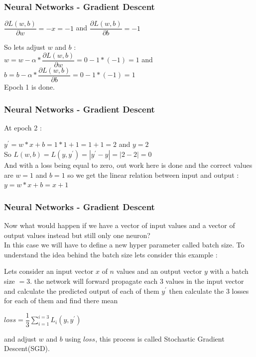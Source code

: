 \documentclass{beamer}
\begin{document}
\begin{frame}
\frametitle{Neural Networks - Gradient Descent}
\begin{example}
\begin{center}
$ \dfrac{\partial L(w,b)}{\partial w} = -x = -1 $ \hspace{5mm} and \hspace{5mm} $ \dfrac{\partial L(w,b)}{\partial b} = -1 $
\end{center}
\begin{center}
So lets adjust $ w $ and $ b $ :\\
$ w = w - \alpha*\dfrac{\partial L(w,b)}{\partial w} = 0 - 1*(-1) = 1 $ \hspace{5mm} and \hspace{5mm} $ b = b - \alpha*\dfrac{\partial L(w,b)}{\partial b} = 0 - 1*(-1) = 1 $\\
Epoch 1 is done.
\end{center}
\end{example}
\end{frame}

\begin{frame}
\frametitle{Neural Networks - Gradient Descent}
\begin{example}
At epoch 2 :
\begin{center}
$ y^{\prime} = w*x + b = 1*1 + 1 = 1 + 1 = 2 $ \hspace{5mm} and \hspace{5mm} $ y = 2 $\\
So \hspace{5mm} $ L(w,b) = L(y,y^{\prime}) = |y^{\prime} - y| = |2 - 2| = 0 $\\
And with a loss being equal to zero, out work here is done and the correct values are $ w = 1 $ and $ b = 1 $ so we get the linear relation between input and output : $ y = w*x + b = x + 1 $
\end{center}
\end{example}
\end{frame}

\begin{frame}
\frametitle{Neural Networks - Gradient Descent}
Now what would happen if we have a vector of input values and a vector of output values instead but still only one neuron?\\
In this case we will have to define a new hyper parameter called batch size. To understand the idea behind the batch size lets consider this example :

\begin{example}
Lets consider an input vector $ x $ of $ n $ values and an output vector $ y $  with a batch size $ = 3 $. the network will forward propagate each 3 values in the input vector and calculate the predicted output of each of them $ y^{\prime} $ then calculate the 3 losses for each of them and find there mean
\begin{center} 
$ loss = \dfrac{1}{3}\sum_{i=1}^{i=3}L_i(y,y^{\prime}) $
\end{center}
and adjust $ w $ and $ b $ using $ loss $, this process is called Stochastic Gradient Descent(SGD).
\end{example}
\end{frame}
\end{document}
